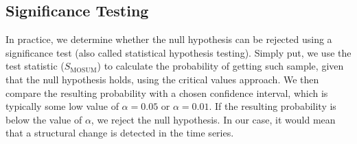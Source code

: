 \documentclass[main.tex]{subfiles}
\begin{document}
\subsection{Significance Testing}
\label{subsec:significance_testing}
In practice, we determine whether the null
hypothesis can be rejected using a significance test (also called statistical
hypothesis testing).
Simply put, we use the test statistic ($S_{\text{MOSUM}}$) to calculate the probability of getting such
sample, given that the null hypothesis holds, using the critical values approach.
We then compare the resulting
probability with a chosen confidence interval, which is typically some low value
of $\alpha = 0.05$ or $\alpha = 0.01$. If the resulting probability is below the
value of $\alpha$, we reject the null hypothesis. 
In our case, it would mean that a
structural change is detected in the time series. 
\end{document}
